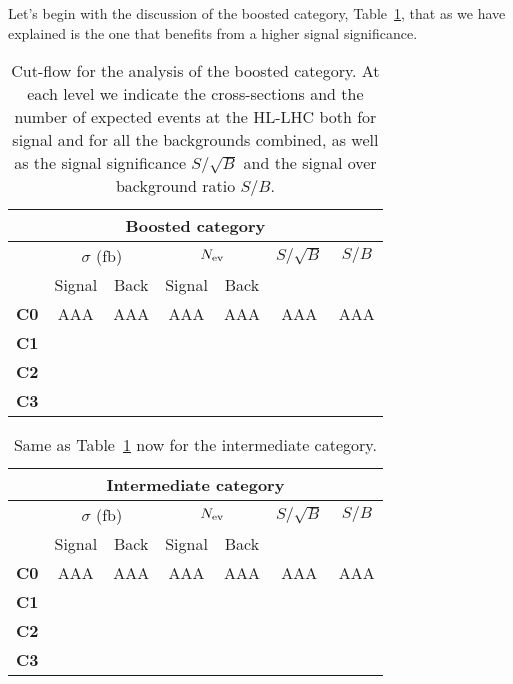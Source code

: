 Let's begin with the discussion of the boosted category,
Table~\ref{table:cutflowboosted}, that as we have explained
is the one that benefits from a higher signal significance.

\begin{table}[t]
  \centering
  \begin{tabular}{c|c|c|c|c|c|c}
    \hline
    \multicolumn{7}{c}{Boosted category}\\
    \hline
    \hline
    &    \multicolumn{2}{c|}{$\sigma$ (fb)}   &  \multicolumn{2}{c|}{$N_{\rm ev}$}
    &   $S/\sqrt{B}$  & $S/B$\\
      &    Signal & Back   &  Signal  & Back
    &   & \\
    \hline
        {\bf C0}  &  AAA  & AAA & AAA & AAA  &  AAA & AAA\\
        {\bf C1}  &       &     &     &      &      &   \\
        {\bf C2}  &       &     &     &      &      &   \\
        {\bf C3}  &       &     &     &      &      &   \\
        \hline
  \end{tabular}
  \caption{\small Cut-flow for the analysis of the boosted
    category.
    At each level we indicate the cross-sections and the number of
    expected events at the HL-LHC both for
    signal and for all the backgrounds combined,
    as well as the signal significance $S/\sqrt{B}$ and the signal
    over background ratio $S/B$.
    \label{table:cutflowboosted}
  }
\end{table}

\begin{table}[t]
  \centering
  \begin{tabular}{c|c|c|c|c|c|c}
    \hline
    \multicolumn{7}{c}{Intermediate category}\\
    \hline
    \hline
    &    \multicolumn{2}{c|}{$\sigma$ (fb)}   &  \multicolumn{2}{c|}{$N_{\rm ev}$}
    &   $S/\sqrt{B}$  & $S/B$\\
      &    Signal & Back   &  Signal  & Back
    &   & \\
    \hline
        {\bf C0}  &  AAA  & AAA & AAA & AAA  &  AAA & AAA\\
        {\bf C1}  &       &     &     &      &      &   \\
        {\bf C2}  &       &     &     &      &      &   \\
        {\bf C3}  &       &     &     &      &      &   \\
        \hline
  \end{tabular}
  \caption{\small Same as Table~\ref{table:cutflowboosted} now for
    the intermediate category.
    \label{table:cutflowintermediate}
  }
\end{table}


